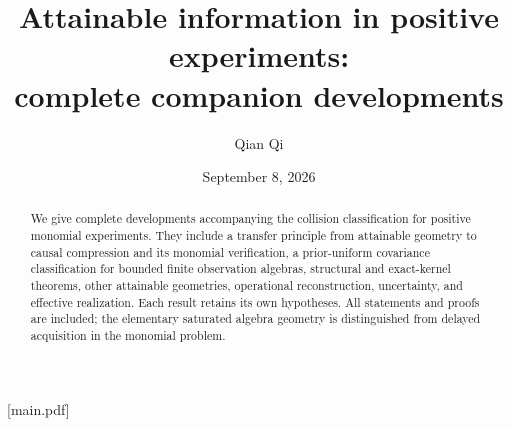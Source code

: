 
\providecommand{\upref}[2]{#1~\ref{#2}}
[main.pdf]
\renewcommand{\thesection}{C.\arabic{section}}
\renewcommand{\theHsection}{companion.\arabic{section}}
\renewcommand{\theequation}{C.\arabic{equation}}
\renewcommand{\theHequation}{companion.\arabic{equation}}
\title[Attainable information: complete companion developments]{Attainable information in positive experiments:\\complete companion developments}
\author{Qian Qi}
\date{September 8, 2026}

\begin{abstract}
We give complete developments accompanying the collision classification
for positive monomial experiments. They include a transfer principle
from attainable geometry to causal compression and its monomial
verification, a prior-uniform covariance classification for bounded
finite observation algebras, structural and exact-kernel theorems,
other attainable geometries, operational reconstruction, uncertainty,
and effective realization. Each result retains its own hypotheses.
All statements and proofs are included; the elementary saturated
algebra geometry is distinguished from delayed acquisition in the
monomial problem.
\end{abstract}
\maketitle






